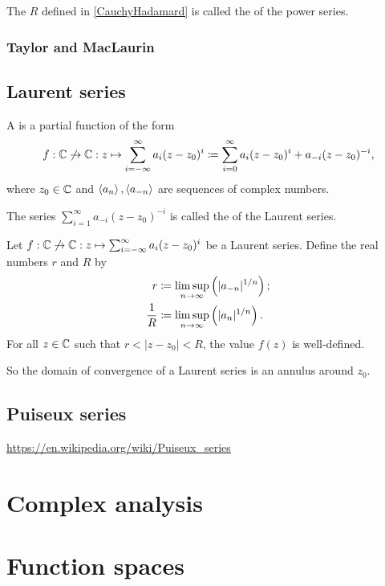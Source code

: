 \begin{definition}
The $R$ defined in \ref{CauchyHadamard} is called the  of the power series.
\end{definition}

\subsection{Taylor and MacLaurin}
\section{Laurent series}
\begin{definition}
A  is a partial function of the form
\[ f: \mathbb{C}\not\to \mathbb{C}: z\mapsto \sum_{i=-\infty}^\infty a_i(z-z_0)^i \coloneqq \sum_{i=0}^\infty a_i(z-z_0)^i + a_{-i}(z-z_0)^{-i}, \]
where $z_0\in \mathbb{C}$ and $\left\langle a_n \right\rangle, \left\langle a_{-n} \right\rangle$ are sequences of complex numbers.

The series $\sum_{i=1}^\infty a_{-i}(z-z_0)^{-i}$ is called the  of the Laurent series.
\end{definition}

\begin{proposition} \label{LaurentSeriesConvergence}
Let $f: \mathbb{C}\not\to \mathbb{C}: z\mapsto \sum_{i=-\infty}^\infty a_i(z-z_0)^i$ be a Laurent series. Define the real numbers $r$ and $R$ by
\begin{align*}
r &\coloneqq \limsup_{n\to\infty}\left(|a_{-n}|^{1/n}\right); \\
\frac{1}{R} &\coloneqq \limsup_{n\to\infty}\left(|a_n|^{1/n}\right).
\end{align*}
For all $z\in \mathbb{C}$ such that $r < |z-z_0| < R$, the value $f(z)$ is well-defined.
\end{proposition}
So the domain of convergence of a Laurent series is an annulus around $z_0$.

\section{Puiseux series}
\url{https://en.wikipedia.org/wiki/Puiseux_series}

\chapter{Complex analysis}


\chapter{Function spaces}
